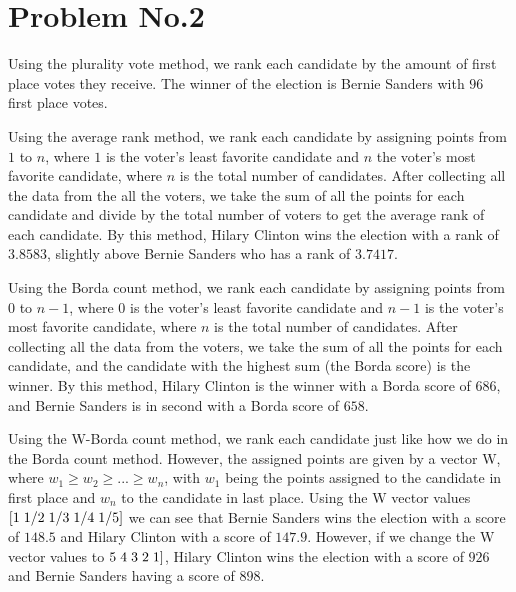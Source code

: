\section*{Problem No.2} \label{sec:prob2}
Using the plurality vote method, we rank each candidate by the amount of first place votes they receive. The winner of the election is Bernie Sanders with $96$ first place votes.\vspace{1pc}

\noindent Using the average rank method, we rank each candidate by assigning points from $1$ to $n$, where $1$ is the voter's least favorite candidate and $n$ the voter's most favorite candidate, where $n$ is the total number of candidates. After collecting all the data from the all the voters, we take the sum of all the points for each candidate and divide by the total number of voters to get the average rank of each candidate. By this method, Hilary Clinton wins the election with a rank of $3.8583$, slightly above Bernie Sanders who has a rank of $3.7417$.\vspace{1pc}

\noindent Using the Borda count method, we rank each candidate by assigning points from $0$ to $n-1$, where $0$ is the voter's least favorite candidate and $n-1$ is the voter's most favorite candidate, where $n$ is the total number of candidates. After collecting all the data from the voters, we take the sum of all the points for each candidate, and the candidate with the highest sum (the Borda score) is the winner. By this method, Hilary Clinton is the winner with a Borda score of $686$, and Bernie Sanders is in second with a Borda score of $658$.\vspace{1pc}

\noindent Using the W-Borda count method, we rank each candidate just like how we do in the Borda count method. However, the assigned points are given by a vector W, where $w_1 \geq w_2 \geq ... \geq w_n$, with $w_1$ being the points assigned to the candidate in first place and $w_n$ to the candidate in last place. Using the W vector values $[1\hspace{1mm} 1/2\hspace{1mm} 1/3\hspace{1mm} 1/4\hspace{1mm} 1/5]$ we can see that Bernie Sanders wins the election with a score of $148.5$ and Hilary Clinton with a score of $147.9$. However, if we change the W vector values to $5\hspace{1mm} 4\hspace{1mm} 3\hspace{1mm} 2\hspace{1mm} 1]$, Hilary Clinton wins the election with a score of $926$ and Bernie Sanders having a score of $898$.\vspace{1pc}

